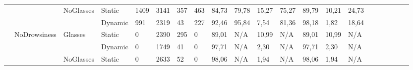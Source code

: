 \documentclass[12pt]{article}
\begin{document}
\begin{landscape}
\begin{table}[]
\begin{adjustbox}{width=1.4\textwidth}
\begin{tabular}{lllllllllllllllccllll}
		\multicolumn{1}{|l|}{} & \multicolumn{1}{l|}{} & \multicolumn{1}{l|}{\multirow{2}{*}{NoGlasses}} & \multicolumn{1}{l|}{Static}  & \multicolumn{1}{l|}{1409} & \multicolumn{1}{l|}{3141} & \multicolumn{1}{l|}{357} & \multicolumn{1}{l|}{463} & \multicolumn{1}{l|}{84,73} & \multicolumn{1}{l|}{79,78} & \multicolumn{1}{l|}{15,27} & \multicolumn{1}{l|}{75,27} & \multicolumn{1}{l|}{89,79} & \multicolumn{1}{l|}{10,21} & \multicolumn{1}{l|}{24,73} & \multicolumn{1}{c|}{} & \multicolumn{1}{c|}{} & \multicolumn{1}{l|}{} & \multicolumn{1}{l|}{} & \multicolumn{1}{l|}{} & \multicolumn{1}{l|}{}\\ \cline{4-15}
		\multicolumn{1}{|l|}{} & \multicolumn{1}{l|}{} & \multicolumn{1}{l|}{} & \multicolumn{1}{l|}{Dynamic} & \multicolumn{1}{l|}{991} & \multicolumn{1}{l|}{2319} & \multicolumn{1}{l|}{43} & \multicolumn{1}{l|}{227} & \multicolumn{1}{l|}{92,46} & \multicolumn{1}{l|}{95,84} & \multicolumn{1}{l|}{7,54} & \multicolumn{1}{l|}{81,36} & \multicolumn{1}{l|}{98,18} & \multicolumn{1}{l|}{1,82} & \multicolumn{1}{l|}{18,64} & \multicolumn{1}{c|}{} & \multicolumn{1}{c|}{} & \multicolumn{1}{l|}{} & \multicolumn{1}{l|}{} & \multicolumn{1}{l|}{} & \multicolumn{1}{l|}{} \\ \cline{2-15}
		\multicolumn{1}{|l|}{} & \multicolumn{1}{l|}{\multirow{4}{*}{NoDrowsiness}} & \multicolumn{1}{l|}{\multirow{2}{*}{Glasses}} & \multicolumn{1}{l|}{Static} & \multicolumn{1}{l|}{0} & \multicolumn{1}{l|}{2390} & \multicolumn{1}{l|}{295} & \multicolumn{1}{l|}{0} & \multicolumn{1}{l|}{89,01} & \multicolumn{1}{l|}{N/A} & \multicolumn{1}{l|}{10,99} & \multicolumn{1}{l|}{N/A} & \multicolumn{1}{l|}{89,01} & \multicolumn{1}{l|}{10,99} & \multicolumn{1}{l|}{N/A} & \multicolumn{1}{c|}{} & \multicolumn{1}{c|}{} & \multicolumn{1}{l|}{} & \multicolumn{1}{l|}{} & \multicolumn{1}{l|}{} & \multicolumn{1}{l|}{}\\ \cline{4-15}
		\multicolumn{1}{|l|}{} & \multicolumn{1}{l|}{} & \multicolumn{1}{l|}{} & \multicolumn{1}{l|}{Dynamic} & \multicolumn{1}{l|}{0} & \multicolumn{1}{l|}{1749} & \multicolumn{1}{l|}{41} & \multicolumn{1}{l|}{0} & \multicolumn{1}{l|}{97,71} & \multicolumn{1}{l|}{N/A} & \multicolumn{1}{l|}{2,30} & \multicolumn{1}{l|}{N/A} & \multicolumn{1}{l|}{97,71} & \multicolumn{1}{l|}{2,30} & \multicolumn{1}{l|}{N/A} & \multicolumn{1}{c|}{} & \multicolumn{1}{c|}{} & \multicolumn{1}{l|}{} & \multicolumn{1}{l|}{} & \multicolumn{1}{l|}{} & \multicolumn{1}{l|}{}\\ \cline{3-15}
		\multicolumn{1}{|l|}{} & \multicolumn{1}{l|}{} & \multicolumn{1}{l|}{\multirow{2}{*}{NoGlasses}} & \multicolumn{1}{l|}{Static} & \multicolumn{1}{l|}{0} & \multicolumn{1}{l|}{2633} & \multicolumn{1}{l|}{52} & \multicolumn{1}{l|}{0} & \multicolumn{1}{l|}{98,06} & \multicolumn{1}{l|}{N/A} & \multicolumn{1}{l|}{1,94} & \multicolumn{1}{l|}{N/A} & \multicolumn{1}{l|}{98,06} & \multicolumn{1}{l|}{1,94} & \multicolumn{1}{l|}{N/A} & \multicolumn{1}{c|}{} & \multicolumn{1}{c|}{} & \multicolumn{1}{l|}{} & \multicolumn{1}{l|}{} & \multicolumn{1}{l|}{} & \multicolumn{1}{l|}{} \\ \cline{4-15}

\end{tabular}
\end{adjustbox}
\end{table}
\end{landscape}
\end{document}
